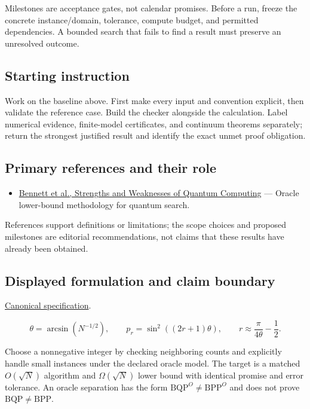 \documentclass[
  11pt,
]{article}
\providecommand{\tightlist}{%
  \setlength{\itemsep}{0pt}\setlength{\parskip}{0pt}}
\begin{document}
Milestones are acceptance gates, not calendar promises. Before a run,
freeze the concrete instance/domain, tolerance, compute budget, and
permitted dependencies. A bounded search that fails to find a result
must preserve an unresolved outcome.

\subsection{Starting instruction}

Work on the baseline above. First make every input and convention
explicit, then validate the reference case. Build the checker alongside
the calculation. Label numerical evidence, finite-model certificates,
and continuum theorems separately; return the strongest justified result
and identify the exact unmet proof obligation.

\subsection{Primary references and their role}

\begin{itemize}
\tightlist
\item
  \href{https://arxiv.org/abs/quant-ph/9701001}{Bennett et al.,
  Strengths and Weaknesses of Quantum Computing} --- Oracle lower-bound
  methodology for quantum search.
\end{itemize}

References support definitions or limitations; the scope choices and
proposed milestones are editorial recommendations, not claims that these
results have already been obtained.

\subsection{Displayed formulation and claim boundary}

\href{https://github.com/rick-stevens-ai/Pure-Thought/blob/main/PRDs/25-Quantum-Algorithms-Complexity.md}{Canonical
specification}.

\[\theta=\arcsin(N^{-1/2}),\qquad
p_r=\sin^2((2r+1)\theta),\qquad
r\approx\frac{\pi}{4\theta}-\frac12.\]

Choose a nonnegative integer by checking neighboring counts and
explicitly handle small instances under the declared oracle model. The
target is a matched \(O(\sqrt N)\) algorithm and \(\Omega(\sqrt N)\)
lower bound with identical promise and error tolerance. An oracle
separation has the form \(\mathrm{BQP}^O\ne\mathrm{BPP}^O\) and does not
prove \(\mathrm{BQP}\ne\mathrm{BPP}\).
\end{document}
